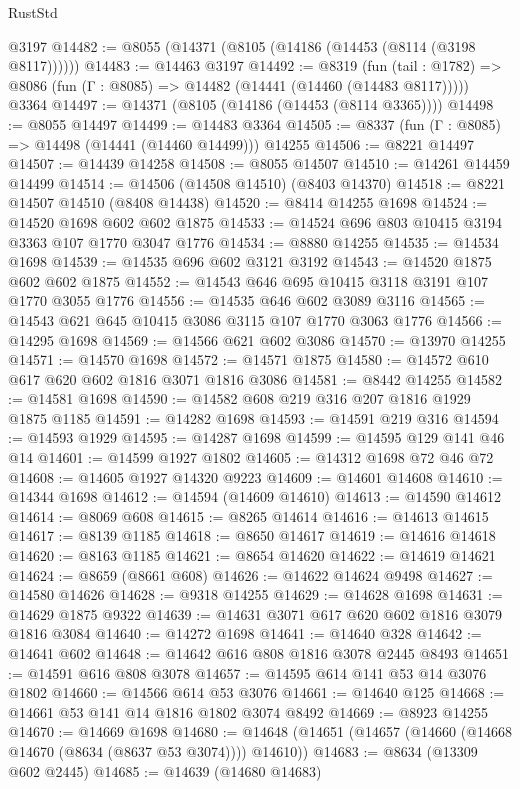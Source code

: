 \begin{lexlean}{RustStd}
\begin{coremodule}
    @3197
@14482 := @8055 (@14371 (@8105 (@14186 (@14453 (@8114 (@3198 @8117))))))
@14483 := @14463 @3197
@14492 := @8319
    (fun (tail : @1782) => @8086 (fun (Γ : @8085) => @14482 (@14441 (@14460 (@14483 @8117)))))
    @3364
@14497 := @14371 (@8105 (@14186 (@14453 (@8114 @3365))))
@14498 := @8055 @14497
@14499 := @14483 @3364
@14505 := @8337 (fun (Γ : @8085) => @14498 (@14441 (@14460 @14499))) @14255
@14506 := @8221 @14497
@14507 := @14439 @14258
@14508 := @8055 @14507
@14510 := @14261 @14459 @14499
@14514 := @14506 (@14508 @14510) (@8403 @14370)
@14518 := @8221 @14507 @14510 (@8408 @14438)
@14520 := @8414 @14255 @1698
@14524 := @14520 @1698 @602 @602 @1875
@14533 := @14524 @696 @803 @10415 @3194 @3363 @107 @1770 @3047 @1776
@14534 := @8880 @14255
@14535 := @14534 @1698
@14539 := @14535 @696 @602 @3121 @3192
@14543 := @14520 @1875 @602 @602 @1875
@14552 := @14543 @646 @695 @10415 @3118 @3191 @107 @1770 @3055 @1776
@14556 := @14535 @646 @602 @3089 @3116
@14565 := @14543 @621 @645 @10415 @3086 @3115 @107 @1770 @3063 @1776
@14566 := @14295 @1698
@14569 := @14566 @621 @602 @3086
@14570 := @13970 @14255
@14571 := @14570 @1698
@14572 := @14571 @1875
@14580 := @14572 @610 @617 @620 @602 @1816 @3071 @1816 @3086
@14581 := @8442 @14255
@14582 := @14581 @1698
@14590 := @14582 @608 @219 @316 @207 @1816 @1929 @1875 @1185
@14591 := @14282 @1698
@14593 := @14591 @219 @316
@14594 := @14593 @1929
@14595 := @14287 @1698
@14599 := @14595 @129 @141 @46 @14
@14601 := @14599 @1927 @1802
@14605 := @14312 @1698 @72 @46 @72
@14608 := @14605 @1927 @14320 @9223
@14609 := @14601 @14608
@14610 := @14344 @1698
@14612 := @14594 (@14609 @14610)
@14613 := @14590 @14612
@14614 := @8069 @608
@14615 := @8265 @14614
@14616 := @14613 @14615
@14617 := @8139 @1185
@14618 := @8650 @14617
@14619 := @14616 @14618
@14620 := @8163 @1185
@14621 := @8654 @14620
@14622 := @14619 @14621
@14624 := @8659 (@8661 @608)
@14626 := @14622 @14624 @9498
@14627 := @14580 @14626
@14628 := @9318 @14255
@14629 := @14628 @1698
@14631 := @14629 @1875 @9322
@14639 := @14631 @3071 @617 @620 @602 @1816 @3079 @1816 @3084
@14640 := @14272 @1698
@14641 := @14640 @328
@14642 := @14641 @602
@14648 := @14642 @616 @808 @1816 @3078 @2445 @8493
@14651 := @14591 @616 @808 @3078
@14657 := @14595 @614 @141 @53 @14 @3076 @1802
@14660 := @14566 @614 @53 @3076
@14661 := @14640 @125
@14668 := @14661 @53 @141 @14 @1816 @1802 @3074 @8492
@14669 := @8923 @14255
@14670 := @14669 @1698
@14680 := @14648 (@14651 (@14657 (@14660 (@14668 @14670 (@8634 (@8637 @53 @3074)))) @14610))
@14683 := @8634 (@13309 @602 @2445)
@14685 := @14639 (@14680 @14683)

\end{coremodule}
\end{lexlean}
